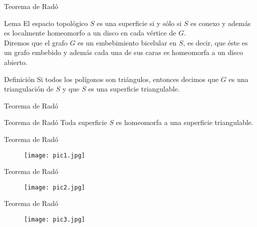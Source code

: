 \documentclass{beamer}
\begin{document}
\begin{frame}{Teorema de Radó}
    \begin{block}{Lema}
    El espacio topológico $S$ es una superficie si y sólo si $S$ es conexo y además es localmente homeomorfo a un disco en cada vértice de $G$.
    \\ Diremos que el grafo $G$ es un embebimiento bicelular en $S$, es decir, que éste es un grafo embebido y además cada una de sus caras es homeomorfa a un disco abierto.
    \end{block}
    \pause
    \begin{alertblock}{Definición}
    Si todos los polígonos son triángulos, entonces decimos que $G$ es una triangulación de $S$ y que $S$ es una superficie triangulable.
    \end{alertblock}
\end{frame}

\begin{frame}{Teorema de Radó}
    \begin{block}{Teorema de Radó}
    Toda superficie $S$ es homeomorfa a una superficie triangulable.
    \end{block}
\end{frame}

\begin{frame}{Teorema de Radó}
    \begin{figure}[h]
    \centering
        \begin{minipage}[c]{\textwidth}
        \centering
        \texttt{[image: pic1.jpg]}
        \end{minipage}
    \end{figure}    
\end{frame}

\begin{frame}{Teorema de Radó}
    \begin{figure}[h]
    \centering
        \begin{minipage}[c]{\textwidth}
        \centering
        \texttt{[image: pic2.jpg]}
        \end{minipage}
    \end{figure}
\end{frame}

\begin{frame}{Teorema de Radó}
    \begin{figure}[h]
    \centering
        \begin{minipage}[c]{\textwidth}
        \centering
        \texttt{[image: pic3.jpg]}
        \end{minipage}
    \end{figure}
\end{frame}
\end{document}
